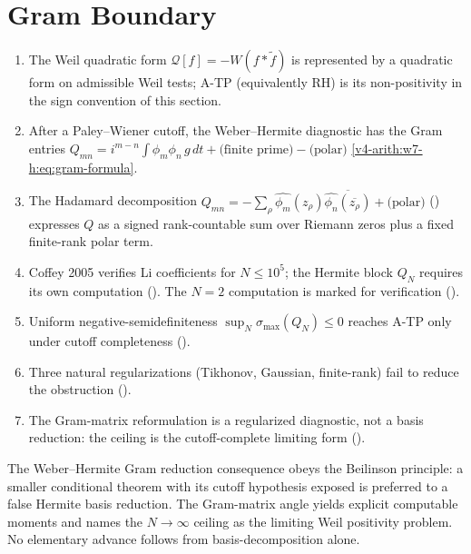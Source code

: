\section{Gram Boundary}
\label{v4-arith:w7-h:summary}

\begin{enumerate}
\item The Weil quadratic form \(\mathcal{Q}[f]=-W(f*\widetilde{f})\)
is represented by a quadratic form on admissible Weil tests; A-TP
(equivalently RH) is its non-positivity in the sign convention of this
section.
\item After a Paley--Wiener cutoff, the Weber--Hermite diagnostic has
the Gram entries
\(Q_{mn}=i^{m-n}\int\phi_{m}\phi_{n}\,g\,dt+\text{(finite prime)}-\text{(polar)}\)
\eqref{v4-arith:w7-h:eq:gram-formula}.
\item The Hadamard decomposition
\(Q_{mn}=-\sum_{\rho}\widehat{\phi_{m}}(z_{\rho})
\overline{\widehat{\phi_{n}}(\overline{z_{\rho}})}+\text{(polar)}\)
() expresses \(Q\) as a signed
rank-countable sum over Riemann zeros plus a fixed finite-rank
polar term.
\item Coffey 2005 verifies Li coefficients for \(N\leq10^{5}\); the
Hermite block \(Q_N\) requires its own computation
(). The \(N=2\) computation is marked
for verification
().
\item Uniform negative-semidefiniteness
\(\sup_{N}\sigma_{\max}(Q_{N})\leq0\) reaches A-TP only under cutoff
completeness
().
\item Three natural regularizations (Tikhonov, Gaussian, finite-rank)
fail to reduce the obstruction
().
\item The Gram-matrix reformulation is a regularized diagnostic, not a
basis reduction: the ceiling is the cutoff-complete limiting form
().
\end{enumerate}

\begin{remark}
\label{v4-arith:w7-h:rem:beilinson}
The Weber--Hermite Gram reduction consequence obeys the Beilinson principle: a smaller
conditional theorem with its cutoff hypothesis exposed is preferred
to a false Hermite basis reduction. The Gram-matrix angle yields
explicit computable moments and names the \(N\to\infty\) ceiling as the
limiting Weil positivity problem. No elementary advance follows from
basis-decomposition alone.
\end{remark}
